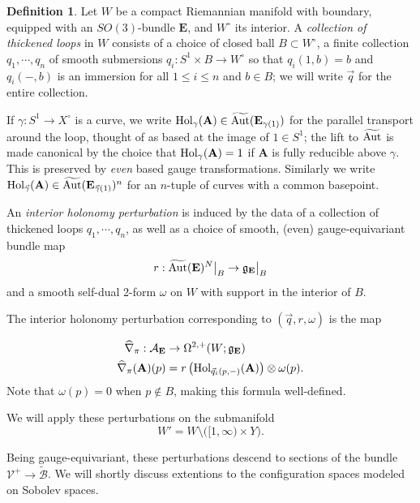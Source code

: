 \documentclass[10pt,a4paper]{amsart}
\theoremstyle{definition}
\newtheorem{definition}[theorem]{Definition}
\theoremstyle{remark}
\numberwithin{figure}{qchap}
\begin{document}
\begin{definition}\label{ThickLoop}Let $W$ be a compact Riemannian manifold with boundary, equipped with an $SO(3)$-bundle $\mathbf{E}$, and $W^\circ$ its interior. A \emph{collection of thickened loops} in $W$ consists of a choice of closed ball $B \subset W^\circ$, a finite collection $q_1, \cdots, q_n$ of smooth submersions $q_i: S^1 \times B \to W^\circ$ so that $q_i(1, b) = b$ and $q_i(-, b)$ is an immersion for all $1 \leq i \leq n$ and $b \in B$; we will write $\vec q$ for the entire collection. 

If $\gamma: S^1 \to X^\circ$ is a curve, we write $\textup{Hol}_\gamma(\mathbf{A}) \in \widetilde{\textup{Aut}}(\mathbf{E}_{\gamma(1)})$ for the parallel transport around the loop, thought of as based at the image of $1 \in S^1$; the lift to $\widetilde{\textup{Aut}}$ is made canonical by the choice that $\textup{Hol}_\gamma(\mathbf{A}) = 1$ if $\mathbf{A}$ is fully reducible above $\gamma$. This is preserved by \emph{even} based gauge transformations. Similarly we write $\textup{Hol}_{\vec \gamma}(\mathbf{A}) \in \widetilde{\textup{Aut}}(\mathbf{E}_{\vec \gamma(1)})^n$ for an $n$-tuple of curves with a common basepoint.

An \emph{interior holonomy perturbation} is induced by the data of a collection of thickened loops $q_1, \cdots, q_n$, as well as a choice of smooth, (even) gauge-equivariant bundle map 
$$r: \widetilde{\textup{Aut}}(\mathbf{E})^N\big|_B \to \mathfrak g_{\mathbf{E}}\big|_B$$ 
and a smooth self-dual 2-form $\omega$ on $W$ with support in the interior of $B$. 

The interior holonomy perturbation corresponding to $(\vec q, r, \omega)$ is the map 

\begin{align*}\widehat{\nabla}_\pi: \mathcal A_{\mathbf{E}} &\to \Omega^{2,+}(W; \mathfrak g_{\mathbf{E}})\\
\widehat{\nabla}_\pi(\mathbf{A})(p) &= r\left(\textup{Hol}_{\vec q_i(p, -)}(\mathbf{A})\right) \otimes \omega(p).\end{align*}
Note that $\omega(p) = 0$ when $p \not\in B$, making this formula well-defined.
\end{definition}

We will apply these perturbations on the submanifold $$W' = W \setminus \big([1,\infty) \times Y\big).$$

Being gauge-equivariant, these perturbations descend to sections of the bundle $\mathcal V^+ \to \widetilde{\mathcal B}$. We will shortly discuss extentions to the configuration spaces modeled on Sobolev spaces.
\end{document}
